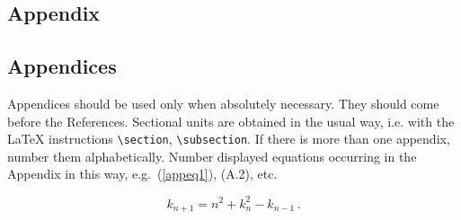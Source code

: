 \begin{appendix}
\chapter{Appendix}

\section{Appendices}\label{appendix}
Appendices should be used only when absolutely necessary. They
should come before the References. Sectional units are obtained
in the usual way, i.e. with the \LaTeX{} instructions
\verb|\section|, \verb|\subsection|.
If there is more than one appendix, number them alphabetically.
Number displayed equations occurring in the Appendix in this way,
e.g.~(\ref{appeq1}), (A.2), etc.

\begin{equation}
k_{n+1} = n^2 + k_n^2 - k_{n-1}\,. \label{appeq1}
\end{equation}


\end{appendix}
